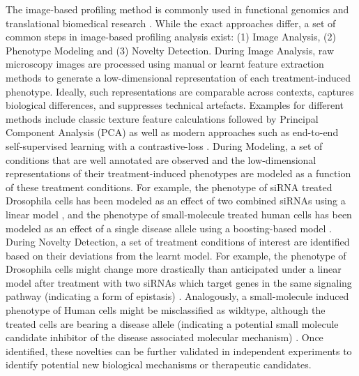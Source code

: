 \begin{flushleft}
The image-based profiling method is commonly used in functional genomics \citep{lauferMappingGeneticInteractions2013, billmannGeneticInteractionMap2016} and translational biomedical research \citep{gibsonStrategyIdentifyingRepurposed2015, moshkovPredictingCompoundActivity2023}. While the exact approaches differ, a set of common steps in image-based profiling analysis exist: (1) Image Analysis, (2) Phenotype Modeling and (3) Novelty Detection. During Image Analysis, raw microscopy images are processed using manual or learnt feature extraction methods to generate a low-dimensional representation of each treatment-induced phenotype. Ideally, such representations are comparable across contexts, captures biological differences, and suppresses technical artefacts. Examples for different methods include classic texture feature calculations followed by Principal Component Analysis (PCA) \citep{caicedoDataanalysisStrategiesImagebased2017} as well as modern approaches such as end-to-end self-supervised learning with a contrastive-loss \citep{perakisContrastiveLearningSingleCell2021}. During Modeling, a set of conditions that are well annotated are observed and the low-dimensional representations of their treatment-induced phenotypes are modeled as a function of these treatment conditions. For example, the phenotype of siRNA treated Drosophila cells has been modeled as an effect of two combined siRNAs using a linear model \citep{billmannGeneticInteractionMap2016}, and the phenotype of small-molecule treated human cells has been modeled as an effect of a single disease allele using a boosting-based model \citep{gibsonStrategyIdentifyingRepurposed2015}. During Novelty Detection, a set of treatment conditions of interest are identified based on their deviations from the learnt model. For example, the phenotype of Drosophila cells might change more drastically than anticipated under a linear model after treatment with two siRNAs which target genes in the same signaling pathway (indicating a form of epistasis) \citep{billmannGeneticInteractionMap2016}. Analogously, a small-molecule induced phenotype of Human cells might be misclassified as wildtype, although the treated cells are bearing a disease allele (indicating a potential small molecule candidate inhibitor of the disease associated molecular mechanism) \citep{gibsonStrategyIdentifyingRepurposed2015}. Once identified, these novelties can be further validated in independent experiments to identify potential new biological mechanisms or therapeutic candidates.
\par


\end{flushleft}
